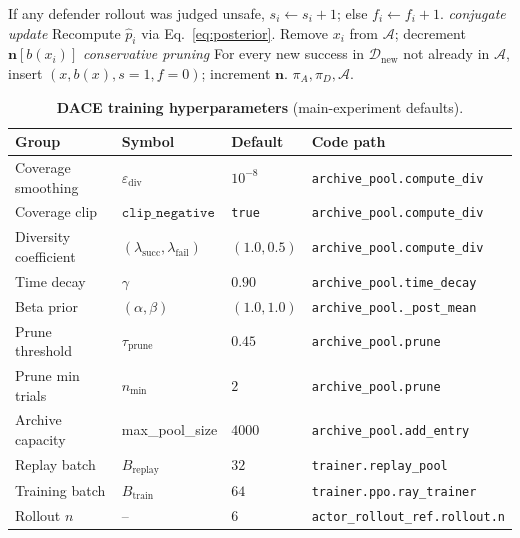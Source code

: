 \documentclass{article}
\newcommand{\method}{\textsc{DACE}\xspace}
\newcommand{\piA}{\pi_A}
\newcommand{\piD}{\pi_D}
\newcommand{\archive}{\mathcal{A}}
\begin{document}
\begin{algorithm}[h]
\begin{algorithmic}[1]
          \STATE If any defender rollout was judged unsafe, $s_i\leftarrow s_i+1$; else $f_i\leftarrow f_i+1$. \hfill\textit{conjugate update}
          \STATE Recompute $\hat p_i$ via Eq.~\ref{eq:posterior}.
            \STATE Remove $x_i$ from $\archive$; decrement $\mathbf{n}[b(x_i)]$ \hfill\textit{conservative pruning}
          \ENDIF
        \ENDFOR
        \STATE For every new success in $\mathcal{D}_{\mathrm{new}}$ not already in $\archive$, insert $(x, b(x), s{=}1, f{=}0)$; increment $\mathbf{n}$.
      \ENDFOR
    \ENDFOR
    \RETURN $\piA, \piD, \archive$.
  \end{algorithmic}
\end{algorithm}

\begin{table}[h]
  \centering
  \small
  \caption{\textbf{\method training hyperparameters} (main-experiment defaults).}
  \label{tab:hyperparams}
  \setlength{\tabcolsep}{4pt}
  \begin{tabular}{llll}
    \toprule
    \textbf{Group} & \textbf{Symbol} & \textbf{Default} & \textbf{Code path} \\
    \midrule
    Coverage smoothing    & $\varepsilon_{\mathrm{div}}$ & $10^{-8}$ & \texttt{archive\_pool.compute\_div} \\
    Coverage clip         & $\mathtt{clip\_negative}$ & \texttt{true} & \texttt{archive\_pool.compute\_div} \\
    Diversity coefficient & $(\lambda_{\mathrm{succ}}, \lambda_{\mathrm{fail}})$ & $(1.0, 0.5)$ & \texttt{archive\_pool.compute\_div} \\
    Time decay            & $\gamma$ & $0.90$ & \texttt{archive\_pool.time\_decay} \\
    Beta prior            & $(\alpha, \beta)$ & $(1.0, 1.0)$ & \texttt{archive\_pool.\_post\_mean} \\
    Prune threshold       & $\tau_{\mathrm{prune}}$ & $0.45$ & \texttt{archive\_pool.prune} \\
    Prune min trials      & $n_{\min}$ & $2$ & \texttt{archive\_pool.prune} \\
    Archive capacity      & max\_pool\_size & $4000$ & \texttt{archive\_pool.add\_entry} \\
    Replay batch          & $B_{\mathrm{replay}}$ & $32$ & \texttt{trainer.replay\_pool} \\
    Training batch        & $B_{\mathrm{train}}$ & $64$ & \texttt{trainer.ppo.ray\_trainer} \\
    Rollout $n$           & -- & $6$ & \texttt{actor\_rollout\_ref.rollout.n} \\
    \bottomrule
  \end{tabular}
\end{table}
\end{document}
